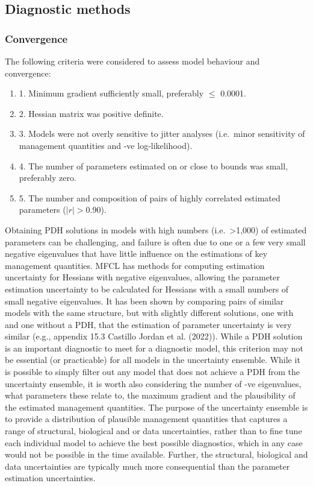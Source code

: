 \documentclass[
  english,
  a4paper,
  a4paper,
  11pt]{SCreport}
\begin{document}
\subsection{Diagnostic methods}\label{sec-diagnostic-methods}

\subsubsection{Convergence}\label{convergence}

The following criteria were considered to assess model behaviour and
convergence:

\begin{enumerate}
\def\labelenumi{\arabic{enumi}.}
\item
  1. Minimum gradient sufficiently small, preferably \(\leq\) 0.0001.
\item
  2. Hessian matrix was positive definite.
\item
  3. Models were not overly sensitive to jitter analyses (i.e.~minor
  sensitivity of management quantities and -ve log-likelihood).
\item
  4. The number of parameters estimated on or close to bounds was small,
  preferably zero.
\item
  5. The number and composition of pairs of highly correlated estimated
  parameters (\(|r| > 0.90\)).
\end{enumerate}

Obtaining PDH solutions in models with high numbers
(i.e.~\textgreater1,000) of estimated parameters can be challenging, and
failure is often due to one or a few very small negative eigenvalues
that have little influence on the estimations of key management
quantities. MFCL has methods for computing estimation uncertainty for
Hessians with negative eigenvalues, allowing the parameter estimation
uncertainty to be calculated for Hessians with a small numbers of small
negative eigenvalues. It has been shown by comparing pairs of similar
models with the same structure, but with slightly different solutions,
one with and one without a PDH, that the estimation of parameter
uncertainty is very similar (e.g., appendix 15.3 Castillo Jordan et al.
(2022)). While a PDH solution is an important diagnostic to meet for a
diagnostic model, this criterion may not be essential (or practicable)
for all models in the uncertainty ensemble. While it is possible to
simply filter out any model that does not achieve a PDH from the
uncertainty ensemble, it is worth also considering the number of -ve
eigenvalues, what parameters these relate to, the maximum gradient and
the plausibility of the estimated management quantities. The purpose of
the uncertainty ensemble is to provide a distribution of plausible
management quantities that captures a range of structural, biological
and or data uncertainties, rather than to fine tune each individual
model to achieve the best possible diagnostics, which in any case would
not be possible in the time available. Further, the structural,
biological and data uncertainties are typically much more consequential
than the parameter estimation uncertainties.
\end{document}
